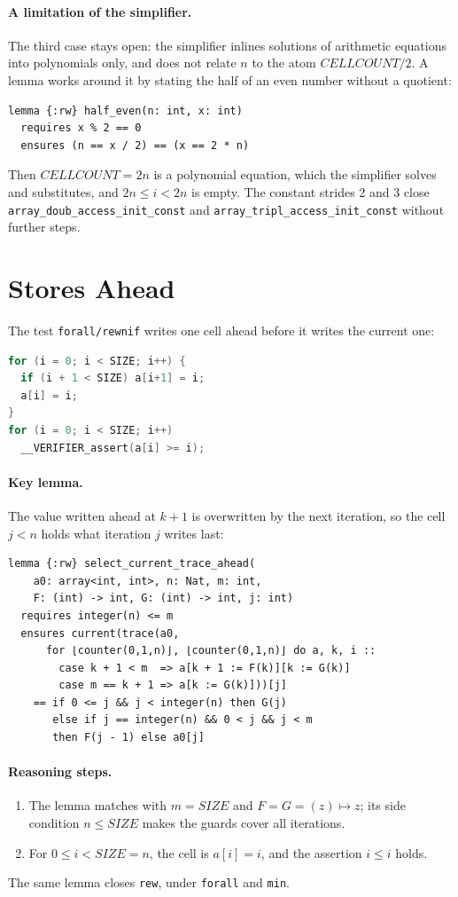\documentclass[sigconf,nonacm]{acmart}
\newcommand{\code}[1]{\texttt{#1}}
\begin{document}
\paragraph{A limitation of the simplifier.} The third case stays open: the
simplifier inlines solutions of arithmetic equations into polynomials only,
and does not relate $n$ to the atom $\mathit{CELLCOUNT}/2$. A lemma works
around it by stating the half of an even number without a quotient:
\begin{lstlisting}[language=dafny]
lemma {:rw} half_even(n: int, x: int)
  requires x % 2 == 0
  ensures (n == x / 2) == (x == 2 * n)
\end{lstlisting}
Then $\mathit{CELLCOUNT} = 2n$ is a polynomial equation, which the
simplifier solves and substitutes, and $2n \le i < 2n$ is empty. The constant
strides 2 and 3 close \code{array\_doub\_access\_init\_const} and
\code{array\_tripl\_access\_init\_const} without further steps.

\section{Stores Ahead}

The test \code{forall/rewnif} writes one cell ahead before it writes the
current one:
\begin{lstlisting}[language=C]
for (i = 0; i < SIZE; i++) {
  if (i + 1 < SIZE) a[i+1] = i;
  a[i] = i;
}
for (i = 0; i < SIZE; i++)
  __VERIFIER_assert(a[i] >= i);
\end{lstlisting}

\paragraph{Key lemma.} The value written ahead at $k+1$ is overwritten by the
next iteration, so the cell $j < n$ holds what iteration $j$ writes last:
\begin{lstlisting}[language=dafny]
lemma {:rw} select_current_trace_ahead(
    a0: array<int, int>, n: Nat, m: int,
    F: (int) -> int, G: (int) -> int, j: int)
  requires integer(n) <= m
  ensures current(trace(a0,
      for ⌊counter(0,1,n)⌋, ⌊counter(0,1,n)⌋ do a, k, i ::
        case k + 1 < m  => a[k + 1 := F(k)][k := G(k)]
        case m == k + 1 => a[k := G(k)]))[j]
    == if 0 <= j && j < integer(n) then G(j)
       else if j == integer(n) && 0 < j && j < m
       then F(j - 1) else a0[j]
\end{lstlisting}

\paragraph{Reasoning steps.}
\begin{enumerate}
\item The lemma matches with $m = \mathit{SIZE}$ and
  $F = G = (z) \mapsto z$; its side condition $n \le \mathit{SIZE}$ makes the
  guards cover all iterations.
\item For $0 \le i < \mathit{SIZE} = n$, the cell is $a[i] = i$, and the
  assertion $i \le i$ holds.
\end{enumerate}
The same lemma closes \code{rew}, under \code{forall} and \code{min}.
\end{document}
